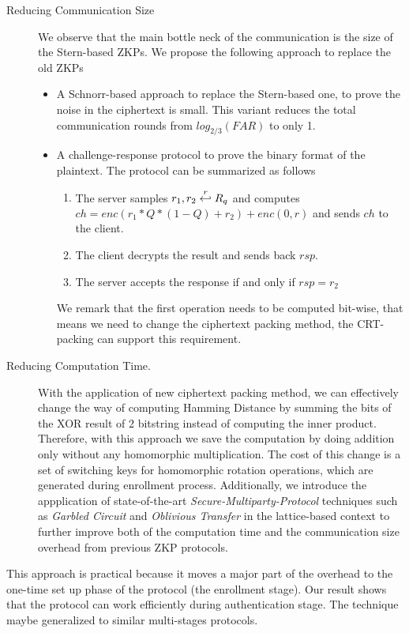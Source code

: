 \begin{description}
\item[Reducing Communication Size] We observe that the main bottle neck of the
  communication is the size of the Stern-based ZKPs. We propose the
  following approach to replace the old ZKPs
  \begin{itemize}
  \item A Schnorr-based approach to replace the Stern-based one, to prove the
    noise in the ciphertext is small. This variant reduces the total
    communication rounds from \(log_{2/3}(FAR)\) to only 1.
  \item A challenge-response protocol to prove the binary format of the
    plaintext. The protocol can be summarized as follows
    \begin{enumerate}
    \item The server samples \(r_{1}, r_{2} \stackrel{r}{\hookleftarrow} R_{q}\) and computes
      \(ch = enc(r_{1}*Q*(1-Q) + r_{2}) + enc(0,r)\) and sends \(ch\) to the
      client.
    \item The client decrypts the result and sends back \(rsp\).
    \item The server accepts the response if and only if \(rsp = r_{2} \)
    \end{enumerate}
    We remark that the first operation needs to be computed bit-wise, that means
    we need to change the ciphertext packing method, the CRT-packing
    \cite{smart2014fully} can support this requirement.
  \end{itemize}
\item[Reducing Computation Time.] With the application of new ciphertext packing
  method, we can effectively change the way of computing Hamming Distance by
  summing the bits of the XOR result of 2 bitstring instead of computing the
  inner product. Therefore, with this approach we save the computation by doing
  addition only without any homomorphic multiplication. The cost of this change
  is a set of switching keys for homomorphic rotation operations, which are
  generated during enrollment process. Additionally, we introduce the
  appplication of state-of-the-art \textit{Secure-Multiparty-Protocol}
  techniques such as \textit{Garbled Circuit} and \textit{Oblivious Transfer} in
  the lattice-based context to further improve both of the computation time and
  the communication size overhead from previous ZKP protocols.
\end{description}
This approach is practical because it moves a major part of the overhead to the
one-time set up phase of the protocol (the enrollment stage). Our result shows
that the protocol can work efficiently during authentication stage. The
technique maybe generalized to similar multi-stages protocols.

